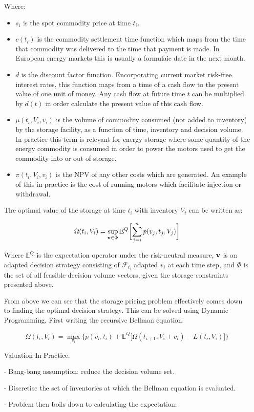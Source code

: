 \documentclass{article}
\begin{document}
Where:
\begin{itemize}
    \item $s_i$ is the spot commodity price at time $t_i$.
    \item $c(t_i)$ is the commodity settlement time function which maps from the 
    time that commodity was delivered to the time that payment is made. In European
    energy markets this is usually a formulaic date in the next month.
    \item $d$ is the discount factor function. Encorporating current market risk-free
    interest rates, this function maps from a time of a cash flow to the present value
    of one unit of money. Any cash flow at future time $t$ can be multiplied by $d(t)$
    in order calculate the present value of this cash flow.
    \item $\mu(t_i, V_i, v_i)$ is the volume of commodity consumed (not added to inventory)
    by the storage facility, as a function of time, inventory and decision volume. In practice
    this term is relevant for energy storage where some quantity of the energy commodity
    is consumed in order to power the motors used to get the commodity into or out of storage.
    \item $\pi(t_i, V_i, v_i)$ is the NPV of any other costs which are generated. An example of
    this in practice is the cost of running motors which facilitate injection or withdrawal.
\end{itemize}

The optimal value of the storage at time $t_i$ with inventory $V_i$ can be written as:

\begin{equation}
    \Omega(t_i, V_i) =  \sup_{\mathbf{v} \in \Phi} \mathbb{E}^Q \biggl[\sum^n_{j=i}p(v_j, t_j, V_j) \biggr]
\end{equation}

Where $\mathbb{E}^Q$ is the expectation operator under the risk-neutral measure, $\mathbf{v}$ is 
an adapted decision strategy consisting of $\mathcal{F}_{t_i}$ adapted $v_i$ at each time step, 
and $\Phi$ is the set of all feasible decision volume vectors, given the storage 
constraints presented above.

\bigskip
From above %
we can see that the storage pricing problem effectively comes down to finding the optimal 
decision strategy. This can be solved using Dynamic Programming. First writing the recursive
Bellman equation.

\begin{equation}
    \Omega(t_i, V_i) = \max_{v_i} \biggl\{ p(v_i, t_i) + \mathbb{E}^Q \biggl[
        \Omega(t_{i+1}, V_i + v_i) - L(t_i, V_i) \biggr] \biggr\}
\end{equation}

\bigskip

\bigskip

Valuation In Practice.

- Bang-bang assumption: reduce the decision volume set.

- Discretise the set of inventories at which the Bellman equation is evaluated.

- Problem then boils down to calculating the expectation.
\end{document}
